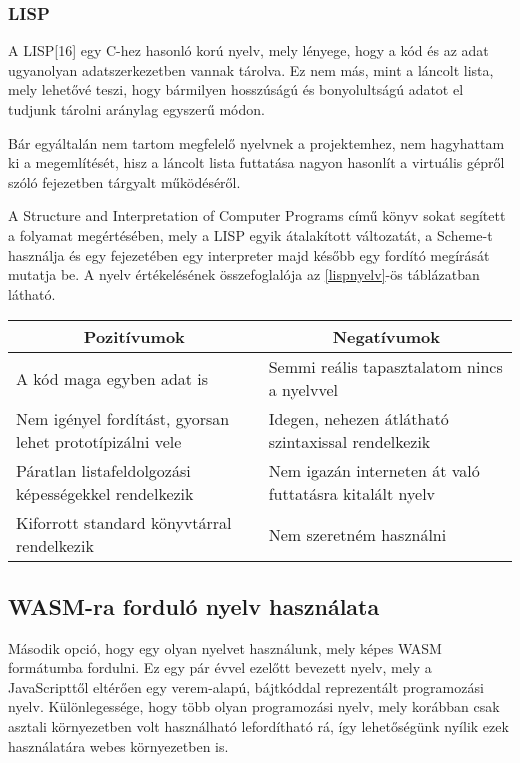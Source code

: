 \subsubsection{LISP}

A LISP[16] egy C-hez hasonló korú nyelv, mely lényege, hogy a kód és az adat ugyanolyan adatszerkezetben vannak tárolva. Ez nem más, mint a láncolt lista, mely lehetővé teszi, hogy bármilyen hosszúságú és bonyolultságú adatot el tudjunk tárolni aránylag egyszerű módon.

Bár egyáltalán nem tartom megfelelő nyelvnek a projektemhez, nem hagyhattam ki a megemlítését, hisz a láncolt lista futtatása nagyon hasonlít a virtuális gépről szóló fejezetben tárgyalt működéséről.

A Structure and Interpretation of Computer Programs\cite{sicp} című könyv sokat segített a folyamat megértésében, mely a LISP egyik átalakított változatát, a Scheme-t használja és egy fejezetében egy interpreter majd később egy fordító megírását mutatja be. A nyelv értékelésének összefoglalója az \ref{lispnyelv}-ös táblázatban látható.

\begin{center}
  \begin{tabularx}{\textwidth}{X X}
    \hline
    \multicolumn{1}{c}{\bfseries{Pozitívumok}}               & \multicolumn{1}{c}{\bfseries{Negatívumok}}              \\
    \hline
    A kód maga egyben adat is                                & Semmi reális tapasztalatom nincs a nyelvvel             \\
    Nem igényel fordítást, gyorsan lehet prototípizálni vele & Idegen, nehezen átlátható szintaxissal rendelkezik      \\
    Páratlan listafeldolgozási képességekkel rendelkezik     & Nem igazán interneten át való futtatásra kitalált nyelv \\
    Kiforrott standard könyvtárral rendelkezik               & Nem szeretném használni                                 \\
    \hline
  \end{tabularx}
\end{center}

\subsection{WASM-ra forduló nyelv használata}

Második opció, hogy egy olyan nyelvet használunk, mely képes WASM formátumba fordulni. Ez egy pár évvel ezelőtt bevezett nyelv, mely a JavaScripttől eltérően egy verem-alapú, bájtkóddal reprezentált programozási nyelv. Különlegessége, hogy több olyan programozási nyelv, mely korábban csak asztali környezetben volt használható lefordítható rá, így lehetőségünk nyílik ezek használatára webes környezetben is.

